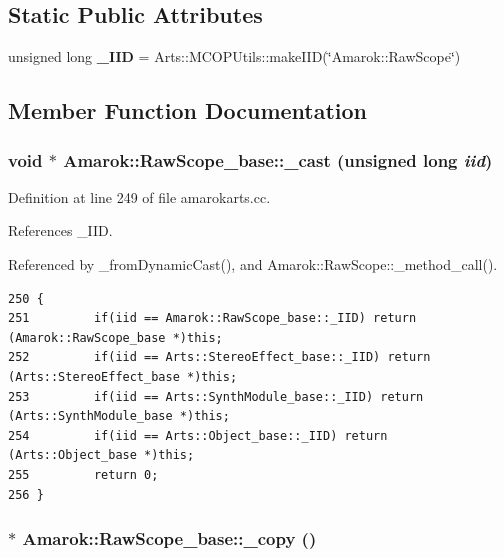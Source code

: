 \subsection*{Static Public Attributes}
\begin{CompactItemize}
\item 
unsigned long {\bf \_\-IID} = Arts::MCOPUtils::make\-IID(\char`\"{}Amarok::Raw\-Scope\char`\"{})
\end{CompactItemize}


\subsection{Member Function Documentation}
\subsubsection{\setlength{\rightskip}{0pt plus 5cm}void $\ast$ Amarok::Raw\-Scope\_\-base::\_\-cast (unsigned long {\em iid})}\label{classAmarok_1_1RawScope__base_Amarok_1_1RawScope__stuba7}




Definition at line 249 of file amarokarts.cc.

References \_\-IID.

Referenced by \_\-from\-Dynamic\-Cast(), and Amarok::Raw\-Scope::\_\-method\_\-call().



\footnotesize\begin{verbatim}250 {
251         if(iid == Amarok::RawScope_base::_IID) return (Amarok::RawScope_base *)this;
252         if(iid == Arts::StereoEffect_base::_IID) return (Arts::StereoEffect_base *)this;
253         if(iid == Arts::SynthModule_base::_IID) return (Arts::SynthModule_base *)this;
254         if(iid == Arts::Object_base::_IID) return (Arts::Object_base *)this;
255         return 0;
256 }
\end{verbatim}\normalsize 
{}
\subsubsection{$\ast$ Amarok::Raw\-Scope\_\-base::\_\-copy ()\hspace{0.3cm}{\tt  [inline]}}\label{classAmarok_1_1RawScope__base_Amarok_1_1RawScope__stuba4}




